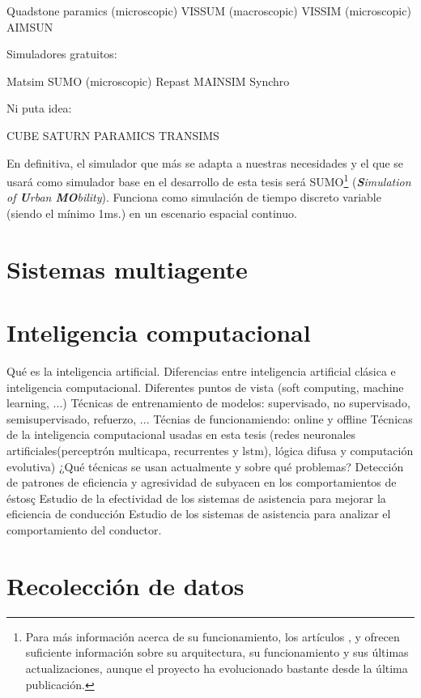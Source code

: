Quadstone paramics (microscopic)
VISSUM (macroscopic)
VISSIM (microscopic)
AIMSUN

Simuladores gratuitos:

Matsim
SUMO (microscopic)
Repast
MAINSIM
Synchro

Ni puta idea:

CUBE
SATURN
PARAMICS
TRANSIMS

En definitiva, el simulador que más se adapta a nuestras necesidades y el que se usará como simulador base en el desarrollo de esta tesis será SUMO\footnote{Para más información acerca de su funcionamiento, los artículos \cite{krajzewicz2002sumo}, \cite{behrisch2011sumo} y \cite{krajzewicz2012recent} ofrecen suficiente información sobre su arquitectura, su funcionamiento y sus últimas actualizaciones, aunque el proyecto ha evolucionado bastante desde la última publicación.} (\textit{\textbf{S}imulation of \textbf{U}rban \textbf{MO}bility}). Funciona como simulación de tiempo discreto variable (siendo el mínimo 1ms.) en un escenario espacial continuo.


\section{Sistemas multiagente}


\section{Inteligencia computacional}

Qué es la inteligencia artificial.
Diferencias entre inteligencia artificial clásica e inteligencia computacional. Diferentes puntos de vista (soft computing, machine learning, ...)
Técnicas de entrenamiento de modelos: supervisado, no supervisado, semisupervisado, refuerzo, ...
Técnias de funcionamiendo: online y offline
Técnicas de la inteligencia computacional usadas en esta tesis (redes neuronales artificiales(perceptrón multicapa, recurrentes y lstm), lógica difusa y computación evolutiva)
¿Qué técnicas se usan actualmente y sobre qué problemas?
Detección de patrones de eficiencia y agresividad de subyacen en los comportamientos de éstosç
Estudio de la efectividad de los sistemas de asistencia para mejorar la eficiencia de conducción
Estudio de los sistemas de asistencia para analizar el comportamiento del conductor.

\section{Recolección de datos}


